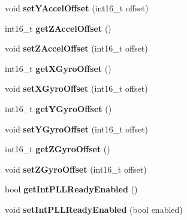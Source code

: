 \begin{DoxyCompactItemize}
\mbox{\label{class_m_p_u6050_a6214fa36c8881f3b02a3e7033678bfb3}} 
void {\bfseries set\+Y\+Accel\+Offset} (int16\+\_\+t offset)
\item 
\mbox{\label{class_m_p_u6050_ac9a45355c735a09501b6a58c92fb752c}} 
int16\+\_\+t {\bfseries get\+Z\+Accel\+Offset} ()
\item 
\mbox{\label{class_m_p_u6050_a4d1868b660d695eae912ef73407e21e8}} 
void {\bfseries set\+Z\+Accel\+Offset} (int16\+\_\+t offset)
\item 
\mbox{\label{class_m_p_u6050_a4c1b9f42f59b11936da86b2a1b099981}} 
int16\+\_\+t {\bfseries get\+X\+Gyro\+Offset} ()
\item 
\mbox{\label{class_m_p_u6050_a7097c12d38a23fb0a286460619998470}} 
void {\bfseries set\+X\+Gyro\+Offset} (int16\+\_\+t offset)
\item 
\mbox{\label{class_m_p_u6050_a1874f796bd3ad97c5a72ab559b33e4a7}} 
int16\+\_\+t {\bfseries get\+Y\+Gyro\+Offset} ()
\item 
\mbox{\label{class_m_p_u6050_a9a725bf3be4e1a74e5f655194bf22bde}} 
void {\bfseries set\+Y\+Gyro\+Offset} (int16\+\_\+t offset)
\item 
\mbox{\label{class_m_p_u6050_aec9b1f7b83d8850858f4200b3afa79fd}} 
int16\+\_\+t {\bfseries get\+Z\+Gyro\+Offset} ()
\item 
\mbox{\label{class_m_p_u6050_aacf6f5599adbfb8ec685f2b96db6905e}} 
void {\bfseries set\+Z\+Gyro\+Offset} (int16\+\_\+t offset)
\item 
\mbox{\label{class_m_p_u6050_a4d02c38682aa566b6204df3f81fbcb68}} 
bool {\bfseries get\+Int\+P\+L\+L\+Ready\+Enabled} ()
\item 
\mbox{\label{class_m_p_u6050_aef44106927c1b986588f36bffaebea54}} 
void {\bfseries set\+Int\+P\+L\+L\+Ready\+Enabled} (bool enabled)
\item 
\mbox{\label{class_m_p_u6050_a3af3f3c0a16b5b68cf6301cb0ac3f392}} 

\end{DoxyCompactItemize}
